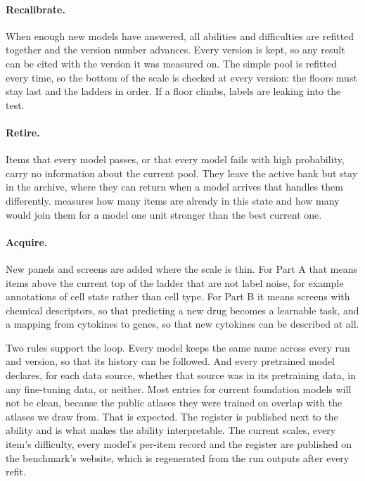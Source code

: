 \documentclass[]{style}
\begin{document}
\paragraph{Recalibrate.}
When enough new models have answered, all abilities and difficulties are refitted
together and the version number advances. Every version is kept, so any result can be
cited with the version it was measured on. The simple pool is refitted every time, so the
bottom of the scale is checked at every version: the floors must stay last and the
ladders in order. If a floor climbs, labels are leaking into the test.

\paragraph{Retire.}
Items that every model passes, or that every model fails with high probability, carry no
information about the current pool. They leave the active bank but stay in the archive,
where they can return when a model arrives that handles them differently.
 measures how many items are already in this state and how many would
join them for a model one unit stronger than the best current one.

\paragraph{Acquire.}
New panels and screens are added where the scale is thin. For Part A that means items
above the current top of the ladder that are not label noise, for example annotations of
cell state rather than cell type. For Part B it means screens with chemical descriptors,
so that predicting a new drug becomes a learnable task, and a mapping from cytokines to
genes, so that new cytokines can be described at all.

Two rules support the loop. Every model keeps the same name across every run and version,
so that its history can be followed. And every pretrained model declares, for each data
source, whether that source was in its pretraining data, in any fine-tuning data, or
neither. Most entries for current foundation models will not be clean, because the public
atlases they were trained on overlap with the atlases we draw from. That is expected. The
register is published next to the ability and is what makes the ability interpretable.
The current scales, every item's difficulty, every model's per-item record and the
register are published on the benchmark's website, which is regenerated from the run
outputs after every refit.
\end{document}
